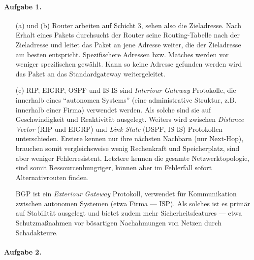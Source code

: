 \documentclass{article}
\begin{document}
\paragraph{Aufgabe 1.}

\begin{enumerate}
    \item[(a) und (b)] Router arbeiten auf Schicht 3, sehen also die Zieladresse. Nach Erhalt eines Pakets durchsucht der Router seine Routing-Tabelle nach der Zieladresse und leitet das Paket an jene Adresse weiter, die der Zieladresse am besten entspricht. Spezifischere Adressen bzw. Matches werden vor weniger spezifischen gewählt. Kann so keine Adresse gefunden werden wird das Paket an das Standardgateway weitergeleitet.
    
    \item[(c)] RIP, EIGRP, OSPF und IS-IS sind \emph{Interiour Gateway} Protokolle, die innerhalb eines \enquote{autonomen Systems} (eine administrative Struktur, z.B. innerhalb einer Firma) verwendet werden. Als solche sind sie auf Geschwindigkeit und Reaktivität ausgelegt. Weiters wird zwischen \emph{Distance Vector} (RIP und EIGRP) und \emph{Link State} (DSPF, IS-IS) Protokollen unterschieden. Erstere kennen nur ihre nächsten Nachbarn (nur Next-Hop), brauchen somit vergleichsweise wenig Rechenkraft und Speicherplatz, sind aber weniger Fehlerresistent. Letztere kennen die gesamte Netzwerktopologie, sind somit Ressourcenhungriger, können aber im Fehlerfall sofort Alternativrouten finden.

    BGP ist ein \emph{Exteriour Gateway} Protokoll, verwendet für Kommunikation zwischen autonomen Systemen (etwa Firma --- ISP). Als solches ist es primär auf Stabilität ausgelegt und bietet zudem mehr Sicherheitsfeatures --- etwa Schutzmaßnahmen vor bösartigen Nachahmungen von Netzen durch Schadakteure.
\end{enumerate}

\paragraph{Aufgabe 2.}
\end{document}

